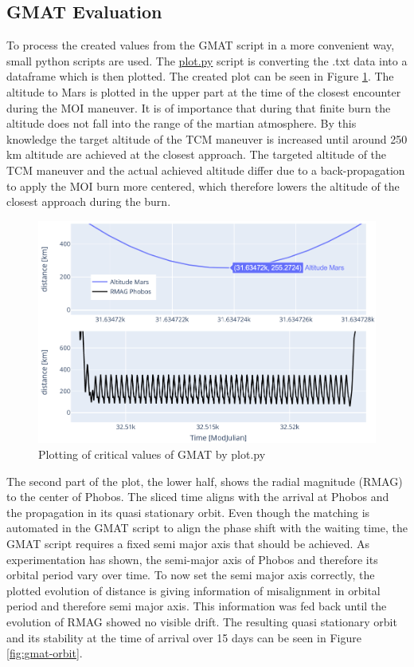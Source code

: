 \subsection{GMAT Evaluation}

To process the created values from the GMAT script in a more convenient way, small python scripts are used.
The \href{https://github.com/Sven-J-Steinert/MomenTUM/blob/main/GMAT/plot.py}{\colorbox{codegray}{plot.py}} script is converting the .txt data into a dataframe which is then plotted.
The created plot can be seen in Figure \ref{fig:py-plot}.
The altitude to Mars is plotted in the upper part at the time of the closest encounter during the MOI maneuver. It is of importance that during that finite burn the altitude does not fall into the range of the martian atmosphere. By this knowledge the target altitude of the TCM maneuver is increased until around 250 km altitude are achieved at the closest approach. The targeted altitude of the TCM maneuver and the actual achieved altitude differ due to a back-propagation to apply the MOI burn more centered, which therefore lowers the altitude of the closest approach during the burn.

\begin{figure}[H]
  \centering
  \includegraphics[width=\linewidth]{img/py_plot.png}
  \caption{Plotting of critical values of GMAT by plot.py}
  \label{fig:py-plot}
\end{figure}

The second part of the plot, the lower half, shows the radial magnitude (RMAG) to the center of Phobos.
The sliced time aligns with the arrival at Phobos and the propagation in its quasi stationary orbit.
Even though the matching is automated in the GMAT script to align the phase shift with the waiting time, the GMAT script requires a fixed semi major axis that should be achieved. As experimentation has shown, the semi-major axis of Phobos and therefore its orbital period vary over time. To now set the semi major axis correctly, the plotted evolution of distance is giving information of misalignment in orbital period and therefore semi major axis. This information was fed back until the evolution of RMAG showed no visible drift. The resulting quasi stationary orbit and its stability at the time of arrival over 15 days can be seen in Figure \ref{fig:gmat-orbit}.

